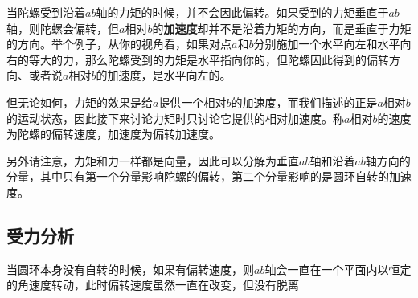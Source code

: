 当陀螺受到沿着$ab$轴的力矩的时候，并不会因此偏转。如果受到的力矩垂直于$ab$轴，则陀螺会偏转，但$a$相对$b$的\textbf{加速度}却并不是沿着力矩的方向，而是垂直于力矩的方向。举个例子，从你的视角看，如果对点$a$和$b$分别施加一个水平向左和水平向右的等大的力，那么陀螺受到的力矩是水平指向你的，但陀螺因此得到的偏转方向、或者说$a$相对$b$的加速度，是水平向左的。



但无论如何，力矩的效果是给$a$提供一个相对$b$的加速度，而我们描述的正是$a$相对$b$的运动状态，因此接下来讨论力矩时只讨论它提供的相对加速度。称$a$相对$b$的速度为陀螺的偏转速度，加速度为偏转加速度。

另外请注意，力矩和力一样都是向量，因此可以分解为垂直$ab$轴和沿着$ab$轴方向的分量，其中只有第一个分量影响陀螺的偏转，第二个分量影响的是圆环自转的加速度。




\subsection{受力分析}



当圆环本身没有自转的时候，如果有偏转速度，则$ab$轴会一直在一个平面内以恒定的角速度转动，此时偏转速度虽然一直在改变，但没有脱离




























